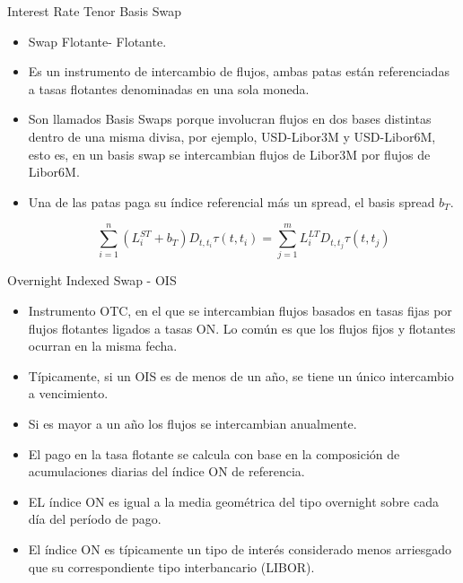 \documentclass[11pt]{beamer}
\begin{document}
\begin{frame}{Interest Rate Tenor Basis  Swap}
	\begin{itemize}
	\item Swap Flotante- Flotante.
	\item Es un instrumento de intercambio de flujos, ambas patas están referenciadas a tasas flotantes denominadas en una sola moneda.

	\item Son llamados Basis Swaps porque involucran flujos en dos bases distintas dentro de una misma divisa, por ejemplo, USD-Libor3M y USD-Libor6M, esto es, en un basis swap se intercambian flujos de Libor3M por flujos de Libor6M.
	
	\item Una de las patas paga su índice referencial más un spread, el basis spread $b_T$.
	
	\begin{equation}
	\sum_{i=1}^{n}(L_i^{ST}+b_T)D_{t,t_i} \tau(t,t_i)= \sum_{j=1}^{m}L_i^{LT}D_{t,t_j} \tau(t,t_j)
	\end{equation}
	
	\end{itemize}
	 
	
	
	
	
	
\end{frame}

\begin{frame}{Overnight Indexed Swap - OIS}
	\begin{itemize}
		\item Instrumento OTC, en el que se intercambian flujos basados en  tasas fijas por flujos flotantes ligados a tasas ON.
		Lo común es que los flujos fijos y flotantes ocurran en la misma fecha.
		\item Típicamente,  si un OIS es de menos de un año, se tiene un único intercambio a vencimiento. 
		\item Si es mayor a un año los flujos se intercambian anualmente.
	\item El pago en la tasa flotante se calcula con base en la composición de acumulaciones diarias del índice ON de referencia.
	\item EL índice ON es igual a la media geométrica del tipo overnight sobre cada día del período de pago.
		\item El índice ON es típicamente un tipo de interés considerado menos arriesgado que su correspondiente tipo interbancario (LIBOR).
	\end{itemize}
\end{frame}
\end{document}
